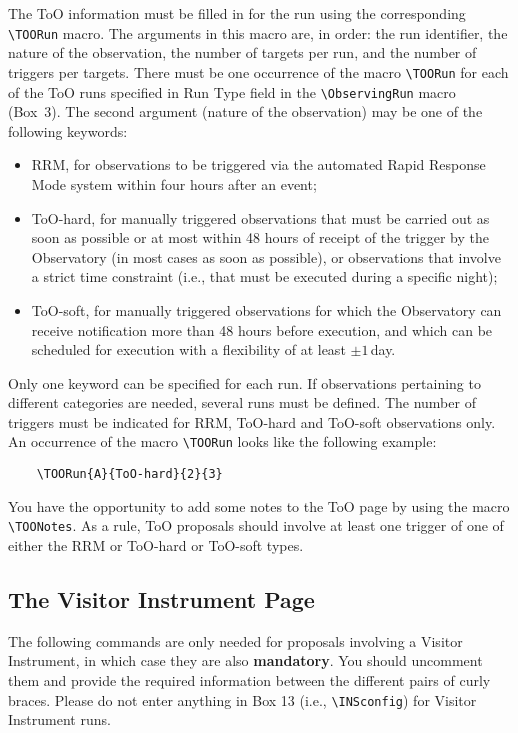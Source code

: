 \documentclass{article}
\begin{document}
The ToO information must be filled in for the run
using the corresponding   \verb|\TOORun| macro.  The arguments in this macro 
are, in order: the run identifier,
the nature of the observation, the number of 
targets per run, and the number of triggers per targets. There must be
one occurrence of the macro \verb|\TOORun| for each of the ToO runs specified
in Run Type field in  the \verb|\ObservingRun| macro (Box~3).
The second argument (nature of the observation) may be one
of the following keywords:
\begin{itemize}
\item RRM, for observations to be triggered via the automated Rapid
  Response Mode system within four hours after an event;
\item ToO-hard, for manually triggered observations that must
  be carried out as soon as possible or at most within 48 hours of receipt of the trigger   
  by the Observatory (in most cases as soon as possible), or observations that
  involve a strict time constraint (i.e., that must be executed during
  a specific night);
\item ToO-soft, for manually triggered observations for which the
  Observatory can receive notification more than 48 hours before
  execution, and which can be scheduled for execution with a
  flexibility of at least $\pm1$\,day.
\end{itemize}
Only one keyword can be specified for each run. If observations
pertaining to different categories are needed,
several runs must be defined. The number of triggers must be indicated
for RRM, ToO-hard and ToO-soft observations only.
An occurrence of the macro \verb|\TOORun|
looks like the following example:
\begin{verbatim}
    \TOORun{A}{ToO-hard}{2}{3}
\end{verbatim}

You have the opportunity to add some notes to the ToO page by using
the macro \verb|\TOONotes|.
As a rule, ToO proposals should involve at least one trigger
of one of either the RRM or ToO-hard or ToO-soft types.

\subsection{The Visitor Instrument Page}
\label{sec:visins}

The following commands are only needed for proposals involving a Visitor
Instrument, in which case they are also {\bf mandatory}.  You should
uncomment them and provide the required information between the
different pairs of curly braces. Please do not enter anything in Box 13 
(i.e., \verb|\INSconfig|) for Visitor Instrument runs.
\end{document}
